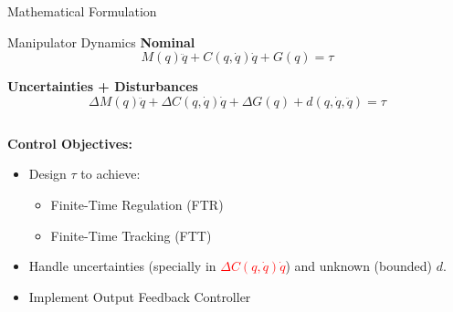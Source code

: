 \begin{frame}
	\sectionpage
\end{frame}

\begin{frame}{Mathematical Formulation}
  \begin{block}{Manipulator Dynamics}
    \textbf{Nominal}
    $$ M(q)\ddot{q} + C(q,\dot{q})\dot{q} + G(q) = \tau $$
    
    \textbf{Uncertainties + Disturbances}
    $$ \Delta M(q)\ddot{q} + \Delta C(q, \dot{q})\dot{q} + \Delta G(q) + d(q,\dot{q}, \ddot{q}) = \tau $$
  \end{block}

  \begin{columns}
    \begin{column}{0.5\textwidth}
      \textbf{Control Objectives:}
      \begin{itemize}
        \item<1-| structure@1> Design $\tau$ to achieve:
          \begin{itemize}
            \item Finite-Time Regulation (FTR) 
            \item Finite-Time Tracking (FTT)
          \end{itemize}
        \item<2-| structure@2> Handle uncertainties (specially in \textcolor{red}{$\Delta C(q,\dot{q}) \dot{q}$}) and unknown (bounded) $d$.
        \item<3-| structure@3> Implement Output Feedback Controller
      \end{itemize}
    \end{column} 
    \begin{column}{0.5\textwidth}
      \end{column}
  \end{columns}
\end{frame}
